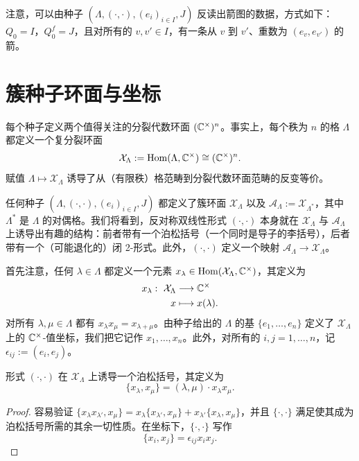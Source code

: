 注意，可以由种子 $(\Lambda,(\cdot,\cdot),(e_i)_{i\in I},J)$ 反读出箭图的数据，方式如下：$Q_0=I$，$Q_0^f=J$，且对所有的 $v,v'\in I$，有一条从 $v$ 到 $v'$、重数为 $(e_v,e_{v'})$ 的箭。

\section{簇种子环面与坐标}

每个种子定义两个值得关注的分裂代数环面 $(\mathbb{C}^\times)^n$。事实上，每个秩为 $n$ 的格 $\Lambda$ 都定义一个复分裂环面
\[
\mathcal{X}_\Lambda:=\operatorname{Hom}(\Lambda,\mathbb{C}^\times)\cong(\mathbb{C}^\times)^n .
\]
赋值 $\Lambda\mapsto\mathcal{X}_\Lambda$ 诱导了从（有限秩）格范畴到分裂代数环面范畴的反变等价。

任何种子 $(\Lambda,(\cdot,\cdot),(e_i)_{i\in I},J)$ 都定义了簇环面 $\mathcal{X}_\Lambda$ 以及 $\mathcal{A}_\Lambda:=\mathcal{X}_{\Lambda^*}$，其中 $\Lambda^*$ 是 $\Lambda$ 的对偶格。我们将看到，反对称双线性形式 $(\cdot,\cdot)$ 本身就在 $\mathcal{X}_\Lambda$ 与 $\mathcal{A}_\Lambda$ 上诱导出有趣的结构：前者带有一个泊松括号（一个同时是导子的李括号），后者带有一个（可能退化的）闭 2-形式。此外，$(\cdot,\cdot)$ 定义一个映射 $\mathcal{A}_\Lambda\to\mathcal{X}_\Lambda$。

首先注意，任何 $\lambda\in\Lambda$ 都定义一个元素 $x_\lambda\in\operatorname{Hom}(\mathcal{X}_\Lambda,\mathbb{C}^\times)$，其定义为
\[
\begin{aligned}
x_\lambda:\ \mathcal{X}_\Lambda&\longrightarrow\mathbb{C}^\times\\
x&\longmapsto x(\lambda).
\end{aligned}
\]
对所有 $\lambda,\mu\in\Lambda$ 都有 $x_\lambda x_\mu=x_{\lambda+\mu}$。由种子给出的 $\Lambda$ 的基 $\{e_1,\dots,e_n\}$ 定义了 $\mathcal{X}_\Lambda$ 上的 $\mathbb{C}^\times$-值坐标，我们把它记作 $x_1,\dots,x_n$。此外，对所有的 $i,j=1,\dots,n$，记 $\epsilon_{ij}:=(e_i,e_j)$。

\begin{proposition}[5.4]
形式 $(\cdot,\cdot)$ 在 $\mathcal{X}_\Lambda$ 上诱导一个泊松括号，其定义为
\[
\{x_\lambda,x_\mu\}=(\lambda,\mu)\cdot x_\lambda x_\mu.
\]
\end{proposition}

\begin{proof}
容易验证 $\{x_\lambda x_{\lambda'},x_\mu\}=x_\lambda\{x_{\lambda'},x_\mu\}+x_{\lambda'}\{x_\lambda,x_\mu\}$，并且 $\{\cdot,\cdot\}$ 满足使其成为泊松括号所需的其余一切性质。在坐标下，$\{\cdot,\cdot\}$ 写作
\[
\{x_i,x_j\}=\epsilon_{ij}x_ix_j.
\]
\end{proof}

